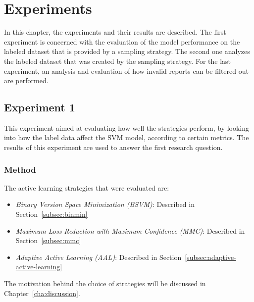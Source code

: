 \chapter{Experiments}
\label{cha:experiments}

In this chapter, the experiments and their results are described.
The first experiment is concerned with the evaluation of the model performance on the labeled dataset that is provided by a sampling strategy.
The second one analyzes the labeled dataset that was created by the sampling strategy.
For the last experiment, an analysis and evaluation of how invalid reports can be filtered out are performed.

\section{Experiment 1}
\label{sec:experiments-exp1}

This experiment aimed at evaluating how well the strategies perform, by looking into how the label data affect the SVM model, according to certain metrics.
The results of this experiment are used to answer the first research question.

\subsection{Method}
\label{sec:experiments-exp1-method}

The active learning strategies that were evaluated are:
\begin{itemize}
    \item \textit{Binary Version Space Minimization (BSVM)}: Described in Section~\ref{subsec:binmin}
    \item \textit{Maximum Loss Reduction with Maximum Confidence (MMC)}: Described in Section~\ref{subsec:mmc}
    \item \textit{Adaptive Active Learning (AAL)}: Described in Section~\ref{subsec:adaptive-active-learning}
\end{itemize}
The motivation behind the choice of strategies will be discussed in Chapter~\ref{cha:discussion}.

